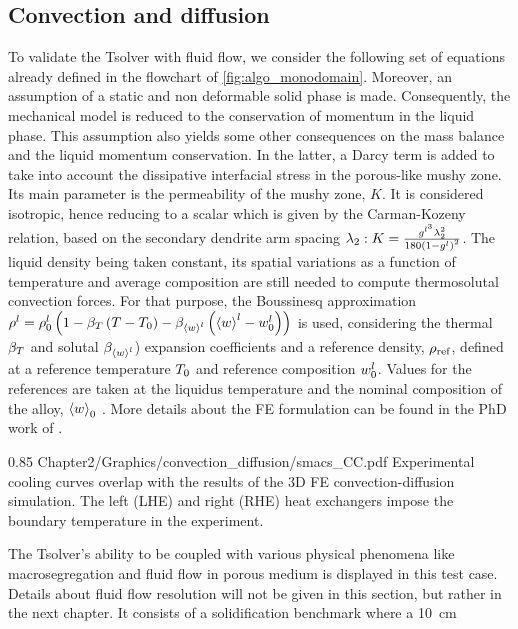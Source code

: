 \subsection{Convection and diffusion}
To validate the Tsolver with fluid flow, we consider the following set of equations
already defined in the flowchart of \cref{fig:algo_monodomain}. Moreover, an assumption 
of a static and non deformable solid phase is made. Consequently, the mechanical model is 
reduced to the conservation of momentum in the liquid phase. This assumption also yields 
some other consequences on the mass balance and the liquid momentum conservation. In the 
latter, a Darcy term is added to take into account the dissipative interfacial stress in 
the porous-like mushy zone. Its main parameter is the permeability of the mushy zone, $K$. 
It is considered isotropic, hence reducing to a scalar which is given by the Carman-Kozeny 
relation, based on the secondary dendrite arm spacing $\lambda_2: K= \frac{g^{l^3}  \lambda_2^{2}
 }{180\left( 1-g^l \right)^2}$. The liquid density being taken constant, its spatial variations 
as a function of temperature and average composition are still needed to compute thermosolutal 
convection forces. For that purpose, the Boussinesq approximation $\rho^l = \rho_{0}^{l} \left( 1-\beta_T 
\left( T-T_{0} \right)-\beta_{\left \langle w \right \rangle^l} \left( \left \langle w \right \rangle^l-w_{0}^l \right) \right)$ is used, considering the thermal $\beta_T$ and solutal $\beta_{\left \langle w \right \rangle^l}$) expansion coefficients 
and a reference density, $\rho_{\text{ref}}$, defined at a reference temperature $T_{0}$ and reference 
composition $w_{0}^l$. Values for the references are taken at the liquidus temperature and the nominal 
composition of the alloy, $\left \langle w \right \rangle_0$ \citep{carozzani_direct_2013}. More details about the FE formulation can be found in 
the PhD work of \citet{rivaux_simulation_2011, carozzani_developpement_2012}.
%
\begin{figureth}
{0.85}
{Chapter2/Graphics/convection_diffusion/smacs_CC.pdf}
{Experimental cooling curves overlap with the results of the 3D FE convection-diffusion simulation.
The left (LHE) and right (RHE) heat exchangers impose the boundary temperature in the experiment.}
\label{fig:validation_convectiondiffusion}
\end{figureth}
%
The Tsolver’s ability to be coupled with various physical phenomena like macrosegregation and fluid flow 
in porous medium is displayed in this test case. Details about fluid flow resolution will not be given 
in this section, but rather in the next chapter. It consists of a solidification benchmark where a \SI{10}{\centi \metre}
